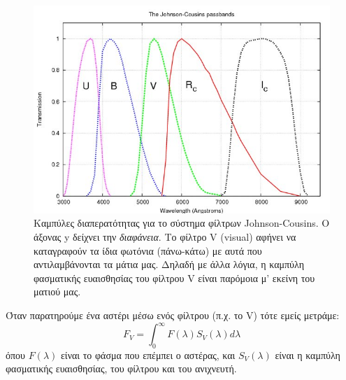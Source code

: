 \begin{figure}
    \centering
    \includegraphics[width=\linewidth]{Figures/filter_curves.jpg}
    \caption{Καμπύλες διαπερατότητας για το σύστημα φίλτρων Johnson-Cousins. Ο άξονας y δείχνει την \textit{διαφάνεια}. Το φίλτρο V (visual) αφήνει να καταγραφούν τα ίδια φωτόνια (πάνω-κάτω) με αυτά που αντιλαμβάνονται τα μάτια μας. Δηλαδή με άλλα λόγια, η καμπύλη φασματικής ευαισθησίας του φίλτρου V είναι παρόμοια μ' εκείνη του ματιού μας.}
    \label{fig:filter_curves}
\end{figure}

Όταν παρατηρούμε ένα αστέρι μέσω ενός φίλτρου (π.χ. το V) τότε εμείς μετράμε:
\begin{equation}
    F_V = \int_0^{\infty} F(\lambda) S_V(\lambda) d\lambda
\end{equation}
όπου $F(\lambda)$ είναι το φάσμα που επέμπει ο αστέρας, και $S_V(\lambda)$ είναι η καμπύλη φασματικής ευαισθησίας, του φίλτρου και του ανιχνευτή.

